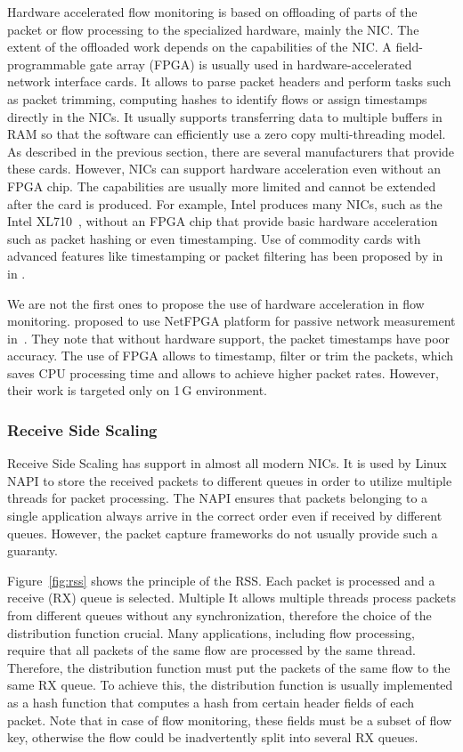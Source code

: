Hardware accelerated flow monitoring is based on offloading of parts of the packet or flow processing to the specialized hardware, mainly the NIC. The extent of the offloaded work depends on the capabilities of the NIC. A field-programmable gate array (FPGA) is usually used in hardware-accelerated network interface cards. It allows to parse packet headers and perform tasks such as packet trimming, computing hashes to identify flows or assign timestamps directly in the NICs. It usually supports transferring data to multiple buffers in RAM so that the software can efficiently use a zero copy multi-threading model. As described in the previous section, there are several manufacturers that provide these cards. However, NICs can support hardware acceleration even without an FPGA chip. The capabilities are usually more limited and cannot be extended after the card is produced. For example, Intel produces many NICs, such as the Intel XL710~\cite{IntelCorporation-2014-xl710},  without an FPGA chip that provide basic hardware acceleration such as packet hashing or even timestamping. Use of commodity cards with advanced features like timestamping or packet filtering has been proposed by \citeauthor{Deri-2013-10} in~\cite{Deri-2013-10} in \citeyear{Deri-2013-10}.

We are not the first ones to propose the use of hardware acceleration in flow monitoring. \citeauthor{Antichi-2012-Enabling} proposed to use NetFPGA platform for passive network measurement in~\cite{Antichi-2012-Enabling}. They note that without hardware support, the packet timestamps have poor accuracy. The use of FPGA allows to timestamp, filter or trim the packets, which saves CPU processing time and allows to achieve higher packet rates. However, their work is targeted only on 1\,G environment.

\subsubsection{Receive Side Scaling}
Receive Side Scaling has support in almost all modern NICs. It is used by Linux NAPI to store the received packets to different queues in order to utilize multiple threads for packet processing. The NAPI ensures that packets belonging to a single application always arrive in the correct order even if received by different queues. However, the packet capture frameworks do not usually provide such a guaranty.

Figure~\ref{fig:rss} shows the principle of the RSS. Each packet is processed and a receive (RX) queue is selected. Multiple It allows multiple threads process packets from different queues without any synchronization, therefore the choice of the distribution function crucial. Many applications, including flow processing, require that all packets of the same flow are processed by the same thread. Therefore, the distribution function must put the packets of the same flow to the same RX queue. To achieve this, the distribution function is usually implemented as a hash function that computes a hash from certain header fields of each packet. Note that in case of flow monitoring, these fields must be a subset of flow key, otherwise the flow could be inadvertently split into several RX queues. 

